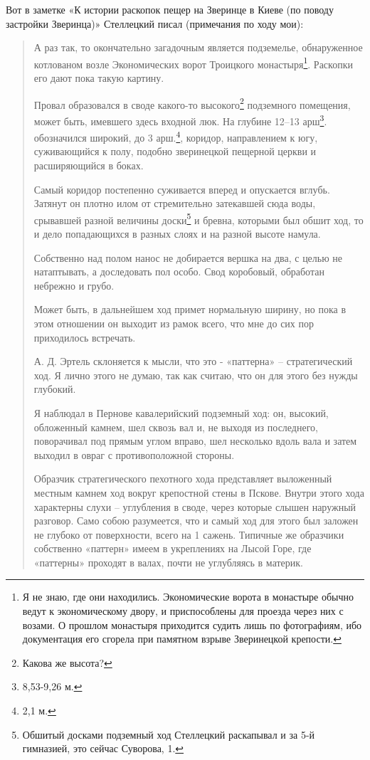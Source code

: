 Вот в заметке «К истории раскопок пещер
на Зверинце в Киеве (по поводу застройки Зверинца)» Стеллецкий писал (примечания по ходу мои):

\begin{quotation}
А раз так, то окончательно загадочным является подземелье, обнаруженное котлованом возле
Экономических ворот Троицкого монастыря\footnote{Я не знаю, где они находились. Экономические ворота в монастыре обычно ведут к экономическому двору, и приспособлены для проезда через них с возами. О прошлом монастыря приходится судить лишь по фотографиям, ибо документация его сгорела при памятном взрыве Зверинецкой крепости.}.
Раскопки его дают пока такую картину.

Провал образовался в своде какого-то высокого\footnote{Какова же высота?} подземного помещения, может быть, имевшего здесь входной люк. На глубине 12–13 арш\footnote{8,53-9,26 м.}.
обозначился широкий, до 3 арш.\footnote{2,1 м.}, коридор, направлением к югу, суживающийся к полу, подобно зверинецкой пещерной церкви и расширяющийся в боках. 

Самый коридор постепенно суживается вперед и опускается вглубь. Затянут он плотно илом от стремительно затекавшей сюда воды, срывавшей разной величины доски\footnote{Обшитый досками подземный ход Стеллецкий раскапывал и за 5-й гимназией, это сейчас Суворова, 1.} и бревна, которыми был обшит ход, то и дело попадающихся в разных слоях и на разной высоте намула.

Собственно над полом нанос не добирается
вершка на два, с целью не натаптывать, а доследовать пол особо. Свод коробовый, обработан небрежно и грубо.

Может быть, в дальнейшем ход примет нормальную ширину, но пока в этом отношении он выходит из рамок всего, что мне до сих пор приходилось встречать.

А. Д. Эртель склоняется к мысли, что это -
«паттерна» – стратегический ход. Я лично этого не думаю, так как считаю, что он для этого без нужды глубокий.

Я наблюдал в Пернове кавалерийский подземный ход: он, высокий, обложенный камнем, шел сквозь вал и, не выходя из последнего, поворачивал под прямым углом вправо, шел несколько вдоль вала и затем выходил в овраг с противоположной стороны.

Образчик стратегического пехотного хода
представляет выложенный местным камнем ход вокруг крепостной стены в Пскове. Внутри этого хода характерны слухи – углубления в своде, через которые слышен наружный разговор. Само собою разумеется, что и самый ход для этого был заложен не глубоко от поверхности, всего на 1 сажень. Типичные же образчики собственно «паттерн» имеем в укреплениях на Лысой Горе, где «паттерны» проходят в валах, почти не углубляясь в материк.


\end{quotation}
